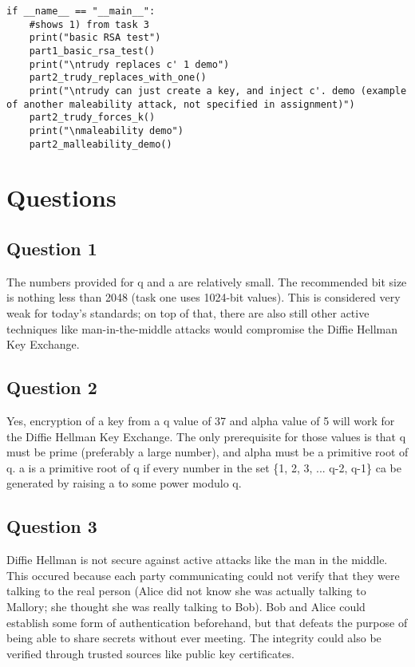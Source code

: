 \documentclass[11pt]{article}
\begin{document}
\begin{lstlisting}
if __name__ == "__main__":
    #shows 1) from task 3
    print("basic RSA test")
    part1_basic_rsa_test()
    print("\ntrudy replaces c' 1 demo")
    part2_trudy_replaces_with_one()
    print("\ntrudy can just create a key, and inject c'. demo (example of another maleability attack, not specified in assignment)")
    part2_trudy_forces_k()
    print("\nmaleability demo")
    part2_malleability_demo()
\end{lstlisting}


\section*{Questions}
\subsection*{Question 1}

The numbers provided for q and a are relatively small. The recommended bit size is nothing less than 2048 (task one uses 1024-bit values). This is considered very weak for today's standards; on top of that, there are also still other active techniques like man-in-the-middle attacks would compromise the Diffie Hellman Key Exchange.

\subsection*{Question 2}

Yes, encryption of a key from a q value of 37 and alpha value of 5 will work for the Diffie Hellman Key Exchange. The only prerequisite for those values is that q must be prime (preferably a large number), and alpha must be a primitive root of q. a is a primitive root of q if every number in the set \{1, 2, 3, ... q-2, q-1\} ca be generated by raising a to some power modulo q.

\subsection*{Question 3}

Diffie Hellman is not secure against active attacks like the man in the middle. This occured because each party communicating could not verify that they were talking to the real person (Alice did not know she was actually talking to Mallory; she thought she was really talking to Bob). Bob and Alice could establish some form of authentication beforehand, but that defeats the purpose of being able to share secrets without ever meeting. The integrity could also be verified through trusted sources like public key certificates.
\end{document}
